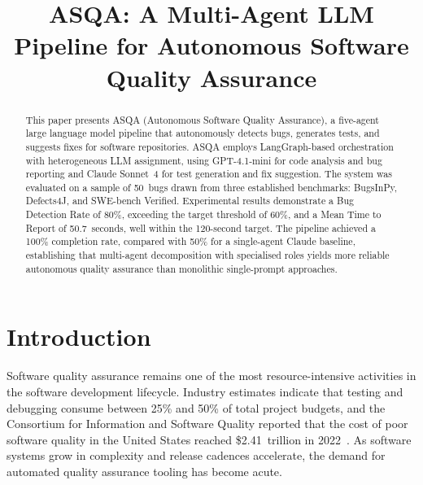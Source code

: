 \documentclass[conference]{IEEEtran}
\begin{document}
\title{ASQA: A Multi-Agent LLM Pipeline for Autonomous Software Quality Assurance}

\author{
}

\maketitle

\begin{abstract}
This paper presents ASQA (Autonomous Software Quality Assurance), a five-agent large language model pipeline that autonomously detects bugs, generates tests, and suggests fixes for software repositories. ASQA employs LangGraph-based orchestration with heterogeneous LLM assignment, using GPT-4.1-mini for code analysis and bug reporting and Claude Sonnet~4 for test generation and fix suggestion. The system was evaluated on a sample of 50~bugs drawn from three established benchmarks: BugsInPy, Defects4J, and SWE-bench Verified. Experimental results demonstrate a Bug Detection Rate of 80\%, exceeding the target threshold of 60\%, and a Mean Time to Report of 50.7~seconds, well within the 120-second target. The pipeline achieved a 100\% completion rate, compared with 50\% for a single-agent Claude baseline, establishing that multi-agent decomposition with specialised roles yields more reliable autonomous quality assurance than monolithic single-prompt approaches.
\end{abstract}

\section{Introduction}

Software quality assurance remains one of the most resource-intensive activities in the software development lifecycle. Industry estimates indicate that testing and debugging consume between 25\% and 50\% of total project budgets, and the Consortium for Information and Software Quality reported that the cost of poor software quality in the United States reached \$2.41~trillion in 2022~\cite{cisq2022}. As software systems grow in complexity and release cadences accelerate, the demand for automated quality assurance tooling has become acute.
\end{document}
